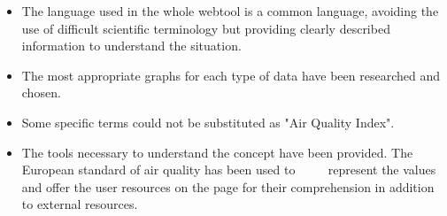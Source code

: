\begin{itemize}
    \item The language used in the whole webtool is a common language, avoiding the use of difficult scientific terminology but providing clearly described information to understand the situation.
    \item The most appropriate graphs for each type of data have been researched and chosen.
    \item Some specific terms could not be substituted as "Air Quality Index".
    \item The tools necessary to understand the concept have been provided. The European standard of air quality has been used to
          represent the values and offer the user resources on the page for their comprehension in addition to external resources.
\end{itemize}